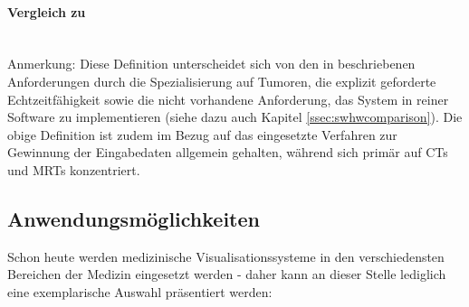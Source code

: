 \documentclass[a4paper,titlepage,12pt]{scrartcl}
\newtheorem[L]{boxedDefinition}{Definition}
\newcommand{\paranl}{$~~$\\}
\begin{document}
\paragraph{Vergleich zu \cite[Kapitel 3.1.1, Seite 17f.]{Bruckner2004}}\paranl\label{p:bru04comparison}
Anmerkung: Diese Definition unterscheidet sich von den in \cite[Kapitel 3.1.1, Seite 17]{Bruckner2004} beschriebenen Anforderungen durch die Spezialisierung auf Tumoren, die explizit geforderte Echtzeitfähigkeit sowie die nicht vorhandene Anforderung, das System in reiner Software zu implementieren (siehe dazu auch Kapitel \vref{ssec:swhwcomparison}). Die obige Definition ist zudem im Bezug auf das eingesetzte Verfahren zur Gewinnung der Eingabedaten allgemein gehalten, während \cite{Bruckner2004} sich primär auf CTs und MRTs konzentriert.

\subsection{Anwendungsmöglichkeiten}\label{ssec:applications}
Schon heute werden medizinische Visualisationssysteme in den verschiedensten Bereichen der Medizin eingesetzt werden - daher kann an dieser Stelle lediglich eine exemplarische Auswahl präsentiert werden:
\end{document}
